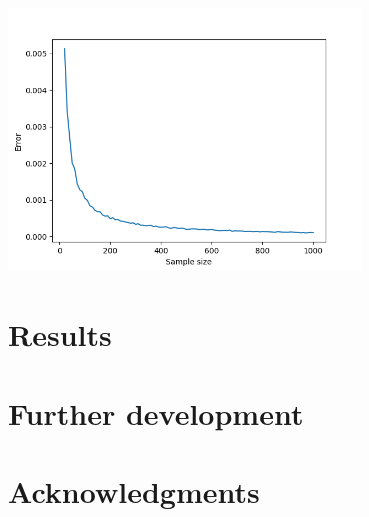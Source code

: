 \documentclass[11pt, a4paper]{article}
\begin{document}
		\begin{center}
			\includegraphics[width=0.7\textwidth]{"Error vs sample size 4"}
		\end{center}
				
\section{Results}
\section{Further development}
\section*{Acknowledgments}
\nocite{*}


\end{document}
